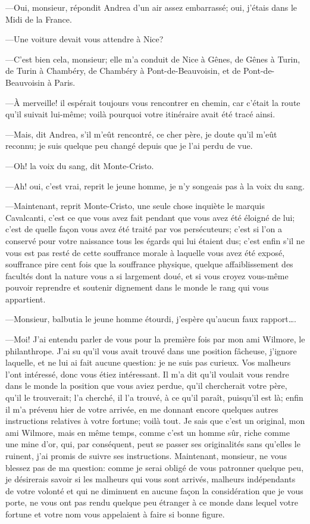—Oui, monsieur, répondit Andrea d'un air assez embarrassé; oui, j'étais dans le Midi de la France. 

—Une voiture devait vous attendre à Nice? 

—C'est bien cela, monsieur; elle m'a conduit de Nice à Gênes, de Gênes à Turin, de Turin à Chambéry, de Chambéry à Pont-de-Beauvoisin, et de Pont-de-Beauvoisin à Paris. 

—À merveille! il espérait toujours vous rencontrer en chemin, car c'était la route qu'il suivait lui-même; voilà pourquoi votre itinéraire avait été tracé ainsi. 

—Mais, dit Andrea, s'il m'eût rencontré, ce cher père, je doute qu'il m'eût reconnu; je suis quelque peu changé depuis que je l'ai perdu de vue. 

—Oh! la voix du sang, dit Monte-Cristo. 

—Ah! oui, c'est vrai, reprit le jeune homme, je n'y songeais pas à la voix du sang. 

—Maintenant, reprit Monte-Cristo, une seule chose inquiète le marquis Cavalcanti, c'est ce que vous avez fait pendant que vous avez été éloigné de lui; c'est de quelle façon vous avez été traité par vos persécuteurs; c'est si l'on a conservé pour votre naissance tous les égards qui lui étaient dus; c'est enfin s'il ne vous est pas resté de cette souffrance morale à laquelle vous avez été exposé, souffrance pire cent fois que la souffrance physique, quelque affaiblissement des facultés dont la nature vous a si largement doué, et si vous croyez vous-même pouvoir reprendre et soutenir dignement dans le monde le rang qui vous appartient. 

—Monsieur, balbutia le jeune homme étourdi, j'espère qu'aucun faux rapport\dots. 

—Moi! J'ai entendu parler de vous pour la première fois par mon ami Wilmore, le philanthrope. J'ai su qu'il vous avait trouvé dans une position fâcheuse, j'ignore laquelle, et ne lui ai fait aucune question: je ne suis pas curieux. Vos malheurs l'ont intéressé, donc vous étiez intéressant. Il m'a dit qu'il voulait vous rendre dans le monde la position que vous aviez perdue, qu'il chercherait votre père, qu'il le trouverait; l'a cherché, il l'a trouvé, à ce qu'il paraît, puisqu'il est là; enfin il m'a prévenu hier de votre arrivée, en me donnant encore quelques autres instructions relatives à votre fortune; voilà tout. Je sais que c'est un original, mon ami Wilmore, mais en même temps, comme c'est un homme sûr, riche comme une mine d'or, qui, par conséquent, peut se passer ses originalités sans qu'elles le ruinent, j'ai promis de suivre ses instructions. Maintenant, monsieur, ne vous blessez pas de ma question: comme je serai obligé de vous patronner quelque peu, je désirerais savoir si les malheurs qui vous sont arrivés, malheurs indépendants de votre volonté et qui ne diminuent en aucune façon la considération que je vous porte, ne vous ont pas rendu quelque peu étranger à ce monde dans lequel votre fortune et votre nom vous appelaient à faire si bonne figure. 

